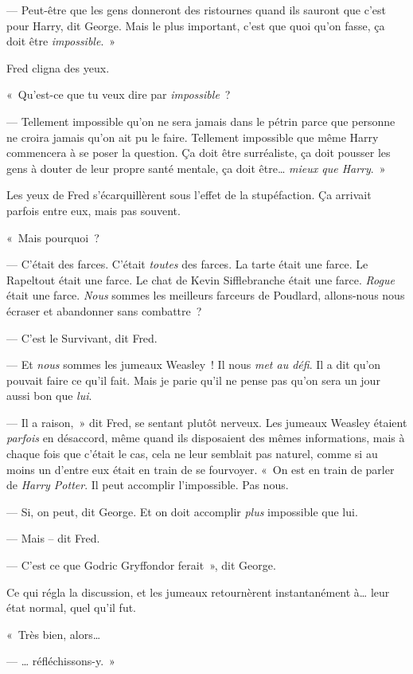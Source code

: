--- Peut-être que les gens donneront des ristournes quand ils sauront que c'est pour Harry, dit George. Mais le plus important, c'est que quoi qu'on fasse, ça doit être \emph{impossible}.~»

Fred cligna des yeux.

«~Qu'est-ce que tu veux dire par \emph{impossible}~?

--- Tellement impossible qu'on ne sera jamais dans le pétrin parce que personne ne croira jamais qu'on ait pu le faire. Tellement impossible que même Harry commencera à se poser la question. Ça doit être surréaliste, ça doit pousser les gens à douter de leur propre santé mentale, ça doit être… \emph{mieux que Harry}.~»

Les yeux de Fred s'écarquillèrent sous l'effet de la stupéfaction. Ça arrivait parfois entre eux, mais pas souvent.

«~Mais pourquoi~?

--- C'était des farces. C'était \emph{toutes} des farces. La tarte était une farce. Le Rapeltout était une farce. Le chat de Kevin Sifflebranche était une farce. \emph{Rogue} était une farce. \emph{Nous} sommes les meilleurs farceurs de Poudlard, allons-nous nous écraser et abandonner sans combattre~?

--- C'est le Survivant, dit Fred.

--- Et \emph{nous} sommes les jumeaux Weasley~! Il nous \emph{met au défi}. Il a dit qu'on pouvait faire ce qu'il fait. Mais je parie qu'il ne pense pas qu'on sera un jour aussi bon que \emph{lui}.

--- Il a raison,~» dit Fred, se sentant plutôt nerveux. Les jumeaux Weasley étaient \emph{parfois} en désaccord, même quand ils disposaient des mêmes informations, mais à chaque fois que c'était le cas, cela ne leur semblait pas naturel, comme si au moins un d'entre eux était en train de se fourvoyer. «~On est en train de parler de \emph{Harry Potter}. Il peut accomplir l'impossible. Pas nous.

--- Si, on peut, dit George. Et on doit accomplir \emph{plus} impossible que lui.

--- Mais -- dit Fred.

--- C'est ce que Godric Gryffondor ferait~», dit George.

Ce qui régla la discussion, et les jumeaux retournèrent instantanément à… leur état normal, quel qu'il fut.

«~Très bien, alors…

--- … réfléchissons-y.~»
